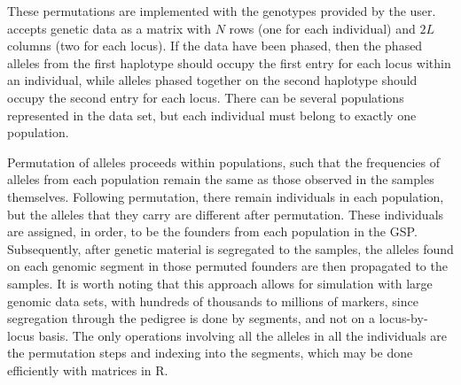 These permutations are implemented with the genotypes provided by the user.
\gscramble{} accepts genetic data as a matrix with $N$ rows (one for each individual) and
$2L$ columns (two for each locus). If the data have been phased, then the phased alleles from the
first haplotype should occupy the
first entry for each locus within an individual, while alleles phased together on the second haplotype should occupy the
second entry for each locus.
There can be several populations represented in the data set, but
each individual must belong to exactly one
population.

Permutation of alleles proceeds within populations, such that
the frequencies of alleles from each population remain the same as those observed
in the samples themselves. Following permutation, there remain individuals
in each population, but the alleles that they carry are different after permutation.  These
individuals are assigned, in order, to be the founders from each population in the GSP. Subsequently,
after genetic material is segregated to the samples, the alleles found on each genomic segment in those permuted
founders are then propagated to the samples.  It is worth noting that this approach allows for simulation
with large genomic data sets, with hundreds of thousands to millions of markers, since segregation
through the pedigree is done by segments, and not on a locus-by-locus basis. The only operations
involving all the alleles in all the individuals are the permutation steps and indexing into the segments,
which may be done efficiently with matrices in R.

